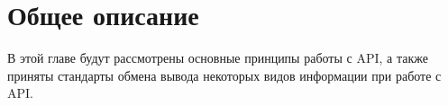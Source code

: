 \newpage
\chapter{Общее описание}

В этой главе будут рассмотрены основные принципы работы с API, а также приняты стандарты обмена вывода некоторых видов информации при работе с API.




